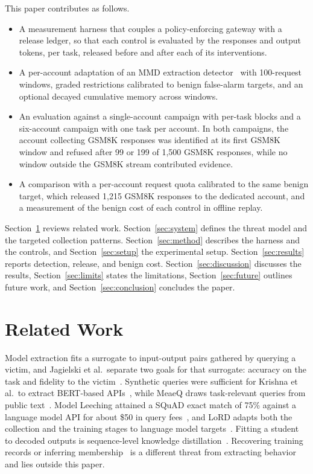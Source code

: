 \documentclass[conference]{IEEEtran}
\begin{document}
This paper contributes as follows.
\begin{itemize}
	\item A measurement harness that couples a policy-enforcing gateway with a release ledger, so that each control is evaluated by the responses and output tokens, per task, released before and after each of its interventions.
	\item A per-account adaptation of an MMD extraction detector~\cite{liu2026detector} with 100-request windows, graded restrictions calibrated to benign false-alarm targets, and an optional decayed cumulative memory across windows.
	\item An evaluation against a single-account campaign with per-task blocks and a six-account campaign with one task per account. In both campaigns, the account collecting GSM8K responses was identified at its first GSM8K window and refused after 99 or 199 of 1,500 GSM8K responses, while no window outside the GSM8K stream contributed evidence.
	\item A comparison with a per-account request quota calibrated to the same benign target, which released 1,215 GSM8K responses to the dedicated account, and a measurement of the benign cost of each control in offline replay.
\end{itemize}

Section~\ref{sec:related} reviews related work. Section~\ref{sec:system} defines the threat model and the targeted collection patterns. Section~\ref{sec:method} describes the harness and the controls, and Section~\ref{sec:setup} the experimental setup. Section~\ref{sec:results} reports detection, release, and benign cost. Section~\ref{sec:discussion} discusses the results, Section~\ref{sec:limits} states the limitations, Section~\ref{sec:future} outlines future work, and Section~\ref{sec:conclusion} concludes the paper.

\section{Related Work}
\label{sec:related}
Model extraction fits a surrogate to input-output pairs gathered by querying a victim, and Jagielski et al.\ separate two goals for that surrogate: accuracy on the task and fidelity to the victim~\cite{jagielski2020high}. Synthetic queries were sufficient for Krishna et al.\ to extract BERT-based APIs~\cite{krishna2020thieves}, while MeaeQ draws task-relevant queries from public text~\cite{dai2023meaeq}. Model Leeching attained a SQuAD exact match of 75\% against a language model API for about \$50 in query fees~\cite{birch2023leeching}, and LoRD adapts both the collection and the training stages to language model targets~\cite{liang2025lord}. Fitting a student to decoded outputs is sequence-level knowledge distillation~\cite{kim2016sequence}. Recovering training records or inferring membership~\cite{carlini2021extracting,shokri2017membership} is a different threat from extracting behavior and lies outside this paper.
\end{document}
